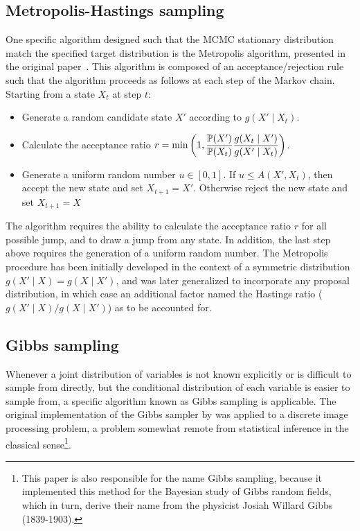 \subsection{Metropolis-Hastings sampling}
\label{subsec:metropolis-hastings-sampling}

One specific algorithm designed such that the \acrshort{MCMC} stationary distribution match the specified target distribution is the Metropolis algorithm, presented in the original paper~\citep{Metropolis1953}.
This algorithm is composed of an acceptance/rejection rule such that the algorithm proceeds as follows at each step of the Markov chain.
Starting from a state $X_t$ at step $t$:
\begin{itemize}
    \item Generate a random candidate state $X'$ according to $g(X'\mid X_t)$.
    \item Calculate the acceptance ratio $\displaystyle r=\min \left(1,{\frac {\mathbb{P} (X')}{\mathbb{P} (X_{t})}}{\frac {g(X_{t}\mid X')}{g(X'\mid X_{t})}}\right)$.
    \item Generate a uniform random number $u\in [0,1]$.
    If $u\leq A(X',X_{t})$, then accept the new state and set $X_{t+1}=X'$.
    Otherwise reject the new state and set $X_{t+1}=X$
\end{itemize}

The algorithm requires the ability to calculate the acceptance ratio $r$ for all possible jump, and to draw a jump from any state.
In addition, the last step above requires the generation of a uniform random number.
The Metropolis procedure has been initially developed in the context of a symmetric distribution $g(X'\mid X) = g(X \mid X')$, and was later generalized to incorporate any proposal distribution, in which case an additional factor named the Hastings ratio ($g(X'\mid X) / g(X \mid X')$) as to be accounted for.

\subsection{Gibbs sampling}
\label{subsec:gibbs-sampling}

Whenever a joint distribution of variables is not known explicitly or is difficult to sample from directly, but the conditional distribution of each variable is easier to sample from, a specific algorithm known as Gibbs sampling is applicable.
The original implementation of the Gibbs sampler by \citet{Geman1984} was applied to a discrete image processing problem, a problem somewhat remote from statistical inference in the classical sense\footnote{This paper is also responsible for the name Gibbs sampling, because it implemented this method for the Bayesian study of Gibbs random fields, which in turn, derive their name from the physicist Josiah Willard Gibbs (1839-1903).}.

